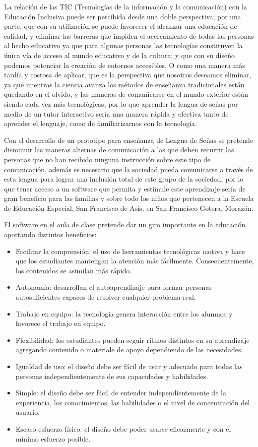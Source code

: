 \documentclass[12pt]{report}%
\begin{document}
La relación de las TIC (Tecnologías de la información y la comunicación) con la Educación Inclusiva puede ser percibida desde una doble perspectiva; por una parte, que con su utilización se puede favorecer el alcanzar una educación de calidad, y eliminar las barreras que impiden el acercamiento de todas las personas al hecho educativo ya que para algunas personas las tecnologías constituyen la única vía de acceso al mundo educativo y de la cultura; y que con su diseño podemos potenciar la creación de entornos accesibles.
O como una manera más tardía y costosa de aplicar, que es la perspectiva que nosotros deseamos eliminar, ya que mientras la ciencia avanza los métodos de enseñanza tradicionales están quedando en el olvido, y las maneras de comunicarse en el mundo exterior están siendo cada vez más tecnológicas, por lo que aprender la lengua de señas por medio de un tutor interactivo sería una manera rápida y efectiva tanto de aprender el lenguaje, como de familiarizarnos con la tecnología. 

Con el desarrollo de un prototipo para enseñanza de Lengua de Señas se pretende disminuir las maneras alternas de comunicación a las que deben recurrir las personas que no han recibido ninguna instrucción sobre este tipo de comunicación, además es necesario que la sociedad pueda comunicarse a través de esta lengua para lograr una inclusión total de este grupo de la sociedad, por lo que tener acceso a un software que permita y estimule este aprendizaje sería de gran beneficio para las familias y sobre todo los niños que pertenecen a la Escuela de Educación Especial, San Francisco de Asís, en San Francisco Gotera, Morazán.

El software en el aula de clase pretende dar un giro importante en la educación aportando distintos beneficios:
\begin{itemize}
	\item Facilitar la comprensión: el uso de herramientas tecnológicas motiva y hace que los 
estudiantes mantengan la atención más fácilmente. Consecuentemente, los contenidos 
se asimilan más rápido. 
\item Autonomía: desarrollan el autoaprendizaje para formar personas autosuficientes 
capaces de resolver cualquier problema real.  
\item Trabajo en equipo: la tecnología genera interacción entre los alumnos y favorece el 
trabajo en equipo. 
\item Flexibilidad: los estudiantes pueden seguir ritmos distintos en su aprendizaje agregando 
contenido o materiale de apoyo dependiendo de las necesidades.  
\item Igualdad de uso: el diseño debe ser fácil de usar y adecuado para todas las personas 
independientemente de sus capacidades y habilidades. 
\item Simple: el diseño debe ser fácil de entender independientemente de la experiencia, los 
conocimientos, las habilidades o el nivel de concentración del usuario. 
\item Escaso esfuerzo físico: el diseño debe poder usarse eficazmente y con el mínimo esfuerzo posible.
\end{itemize}
\end{document}
